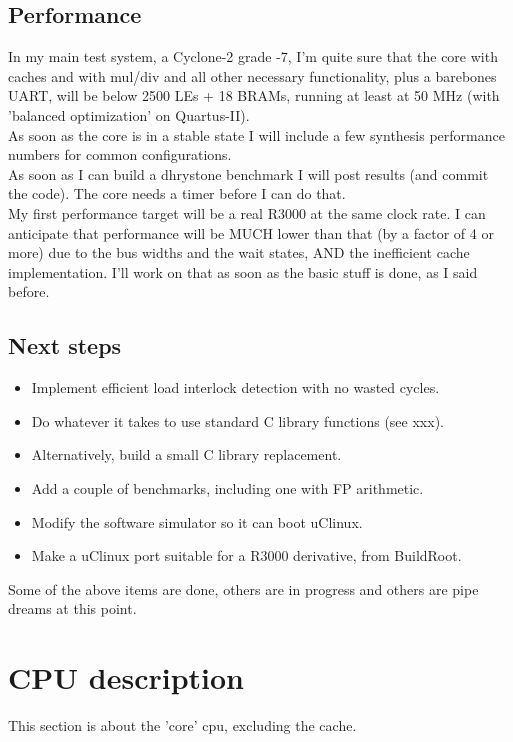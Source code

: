\documentclass[11pt]{article}
\begin{document}
\subsection{Performance}
\label{performance}
    In my main test system, a Cyclone-2 grade -7, I'm quite sure that the core
    with caches and with mul/div and all other necessary functionality, plus 
    a barebones UART, will be below 2500 LEs + 18 BRAMs, running at least at 
    50 MHz (with 'balanced optimization' on Quartus-II).\\
    
    As soon as the core is in a stable state I will include a few synthesis
    performance numbers for common configurations.\\

    As soon as I can build a dhrystone benchmark I will post results (and commit
    the code). The core needs a timer before I can do that.\\
    
    My first performance target will be a real R3000 at the same clock rate.
    I can anticipate that performance will be MUCH lower than that (by a factor 
    of 4 or more) due to the bus widths and the wait states, AND the inefficient
    cache implementation. I'll work on that as soon as the basic stuff is done,
    as I said before.
   
\subsection{Next steps}
\label{next_steps}
    \begin{itemize}
    \item Implement efficient load interlock detection with no wasted cycles.
    \item Do whatever it takes to use standard C library functions (see xxx).
    \item Alternatively, build a small C library replacement.
    \item Add a couple of benchmarks, including one with FP arithmetic.
    \item Modify the software simulator so it can boot uClinux.
    \item Make a uClinux port suitable for a R3000 derivative, from BuildRoot.
    \end{itemize}

    Some of the above items are done, others are in progress and others
    are pipe dreams at this point.
    
    
\section{CPU description}
\label{cpu_description}
    This section is about the 'core' cpu, excluding the cache.
\end{document}
